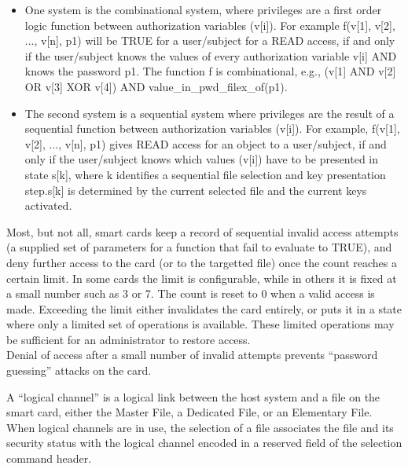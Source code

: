   \begin{itemize}
  \item One system is the combinational system, where privileges are a
    first order logic function between authorization variables (v[i]). For
    example f(v[1], v[2], ..., v[n], p1) will be TRUE for a user/subject
    for a READ access, if and only if the user/subject knows the values of
    every authorization variable v[i] AND knows the password p1. The
    function f is combinational, e.g., (v[1] AND v[2] OR v[3] XOR v[4]) AND
    value\_in\_pwd\_filex\_of(p1).
    
  \item The second system is a sequential system where privileges are the
    result of a sequential function between authorization variables (v[i]).
    For example, f(v[1], v[2], ..., v[n], p1) gives READ access for an
    object to a user/subject, if and only if the user/subject knows which
    values (v[i]) have to be presented in state s[k], where k identifies a
    sequential file selection and key presentation step.s[k] is determined
    by the current selected file and the current keys activated.
  \end{itemize}

  
  Most, but not all, smart cards keep a record of sequential invalid access
  attempts (a supplied set of parameters for a function that fail to
  evaluate to TRUE), and deny further access to the card (or to the
  targetted file) once the count reaches a certain limit. In some cards the
  limit is configurable, while in others it is fixed at a small number such
  as 3 or 7. The count is reset to 0 when a valid access is made. Exceeding
  the limit either invalidates the card entirely, or puts it in a state
  where only a limited set of operations is available.  These limited
  operations may be sufficient for an administrator to restore access.\\
  
  Denial of access after a small number of invalid attempts prevents
  ``password guessing'' attacks on the card.


  
  A ``logical channel'' is a logical link between the host system and a
  file on the smart card, either the Master File, a Dedicated File, or an
  Elementary File. When logical channels are in use, the selection of a
  file associates the file and its security status with the logical channel
  encoded in a reserved field of the selection command header.\\

